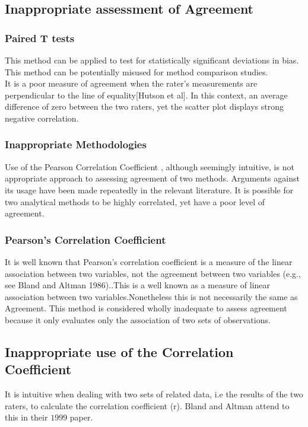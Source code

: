 \documentclass[12pt, a4paper]{report}
\begin{document}
	\subsection{Inappropriate assessment of Agreement}
	\subsubsection{Paired T tests} This method can be applied to test for
	statistically significant deviations in bias. This method can be
	potentially misused for method comparison studies.
	\\It is a poor measure of agreement when the rater's measurements
	are perpendicular to the line of equality[Hutson et al]. In this
	context, an average difference of zero between the two raters, yet
	the scatter plot displays strong negative correlation.
	\subsubsection{Inappropriate Methodologies} Use of the Pearson
	Correlation Coefficient , although seemingly intuitive, is not
	appropriate approach to assessing agreement of two methods.
	Arguments against its usage have been made repeatedly in the
	relevant literature. It is possible for two analytical methods to
	be highly correlated, yet have a poor level of agreement.
	\subsubsection{Pearson's Correlation Coefficient} It is well known that
	Pearson's correlation coefficient is a measure of the linear
	association between two variables, not the agreement between two
	variables (e.g., see Bland and Altman 1986)..This is a well known
	as a measure of linear association between two
	variables.Nonetheless this is not necessarily the same as
	Agreement. This method is considered wholly inadequate to assess
	agreement because it only evaluates only the association of two
	sets of observations.
	
	\subsection{Inappropriate use of the Correlation Coefficient}
	It is intuitive when dealing with two sets of related data, i.e
	the results of the two raters,  to calculate the correlation
	coefficient (r). Bland and Altman attend to this in their $1999$
	paper.
	
\end{document}

